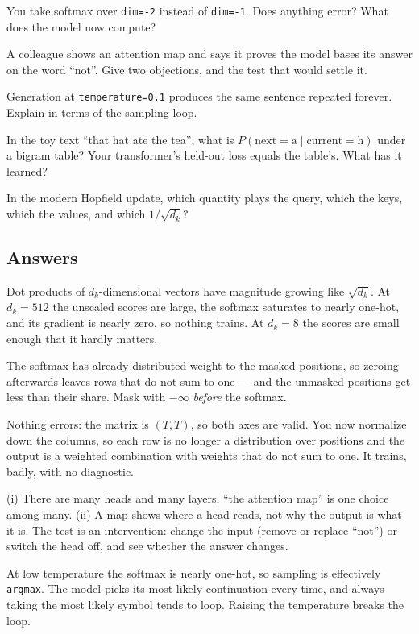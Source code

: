 \documentclass[11pt]{article}
\begin{document}
 You take softmax over \texttt{dim=-2} instead of \texttt{dim=-1}. Does
anything error? What does the model now compute?

 A colleague shows an attention map and says it proves the model bases
its answer on the word ``not''. Give two objections, and the test that would
settle it.

 Generation at \texttt{temperature=0.1} produces the same sentence
repeated forever. Explain in terms of the sampling loop.

 In the toy text ``that hat ate the tea'', what is
$P(\text{next}=\text{a}\mid\text{current}=\text{h})$ under a bigram table? Your
transformer's held-out loss equals the table's. What has it learned?

 In the modern Hopfield update, which quantity plays the query, which the
keys, which the values, and which $1/\sqrt{d_k}$?

\subsection*{Answers}

 Dot products of $d_k$-dimensional vectors have magnitude growing like
$\sqrt{d_k}$. At $d_k = 512$ the unscaled scores are large, the softmax saturates
to nearly one-hot, and its gradient is nearly zero, so nothing trains. At
$d_k = 8$ the scores are small enough that it hardly matters.

 The softmax has already distributed weight to the masked positions, so
zeroing afterwards leaves rows that do not sum to one --- and the unmasked
positions get less than their share. Mask with $-\infty$ \emph{before} the
softmax.

 Nothing errors: the matrix is $(T, T)$, so both axes are valid. You now
normalize down the columns, so each row is no longer a distribution over
positions and the output is a weighted combination with weights that do not sum
to one. It trains, badly, with no diagnostic.

 (i) There are many heads and many layers; ``the attention map'' is one
choice among many. (ii) A map shows where a head reads, not why the output is
what it is. The test is an intervention: change the input (remove or replace
``not'') or switch the head off, and see whether the answer changes.

 At low temperature the softmax is nearly one-hot, so sampling is
effectively \texttt{argmax}. The model picks its most likely continuation every
time, and always taking the most likely symbol tends to loop. Raising the
temperature breaks the loop.
\end{document}
